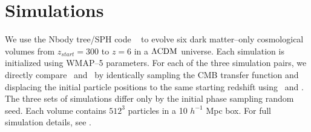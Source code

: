 \section{Simulations}
\label{sec:simulations}

We use the Nbody tree/SPH code \gadgettwo\ \citep{2005MNRAS.364.1105S} to evolve six dark matter--only cosmological volumes from $z_{start} = 300$ to $z = 6$ in a $\rm \Lambda CDM$ universe.  Each simulation is initialized using WMAP--5 parameters.  For each of the three simulation pairs, we directly compare \lpt\ and \za\ by identically sampling the CMB transfer function and displacing the initial particle positions to the same starting redshift using \lpt\ and \za.  The three sets of simulations differ only by the initial phase sampling random seed.  Each volume contains $512^{3}$ particles in a 10 $h^{-1}$ Mpc box.  For full simulation details, see \citet{2012ApJ...761L...8H}.

